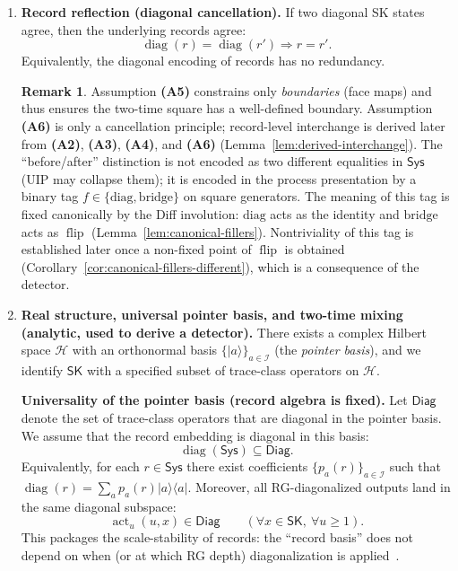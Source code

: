 \documentclass[aps,prl,reprint]{revtex4-2}
\newcommand{\Sys}{\mathsf{Sys}}
\newcommand{\SK}{\mathsf{SK}}
\newcommand{\diag}{\operatorname{diag}}
\newcommand{\flip}{\operatorname{flip}}
\newcommand{\actU}{\operatorname{act}_u}
\theoremstyle{definition}
\newtheorem{remark}{Remark}[section]
\theoremstyle{plain}
\begin{document}
\begin{enumerate}[label=\textbf{(A\arabic*)},leftmargin=*,itemsep=0.6em]
\item \textbf{Record reflection (diagonal cancellation).}
If two diagonal SK states agree, then the underlying records agree:
\[
  \diag(r) = \diag(r') \Rightarrow r = r'.
\]
Equivalently, the diagonal encoding of records has no redundancy.

\begin{remark}
\label{rem:limited-scope-theorem-translation-clean-001}
Assumption \textbf{(A5)} constrains only \emph{boundaries} (face maps) and thus
ensures the two-time square has a well-defined boundary. Assumption \textbf{(A6)}
is only a cancellation principle; record-level interchange is derived later from
\textbf{(A2)}, \textbf{(A3)}, \textbf{(A4)}, and \textbf{(A6)} (Lemma~\ref{lem:derived-interchange}). The
``before/after'' distinction is not encoded as two different equalities in
$\Sys$ (UIP may collapse them); it is encoded in the process presentation by a
binary tag $f\in\{\mathrm{diag},\mathrm{bridge}\}$ on square generators. The
meaning of this tag is fixed canonically by the Diff involution: $\mathrm{diag}$
acts as the identity and $\mathrm{bridge}$ acts as $\flip$ (Lemma~\ref{lem:canonical-fillers}).
Nontriviality of this tag is established later once a non-fixed point of $\flip$
is obtained (Corollary~\ref{cor:canonical-fillers-different}), which is a
consequence of the detector.
\end{remark}

\item \textbf{Real structure, universal pointer basis, and two-time mixing (analytic, used to derive a detector).}
There exists a complex Hilbert space $\mathcal H$ with an orthonormal basis
$\{\lvert a\rangle\}_{a\in\mathcal I}$ (the \emph{pointer basis}), and we identify
$\SK$ with a specified subset of trace-class operators on $\mathcal H$.

\medskip
\noindent
\textbf{Universality of the pointer basis (record algebra is fixed).}
Let $\mathsf{Diag}$ denote the set of trace-class operators that are diagonal in the pointer basis.
We assume that the record embedding is diagonal in this basis:
\[
  \diag(\Sys)\subseteq \mathsf{Diag}.
\]
Equivalently, for each $r\in\Sys$ there exist coefficients $\{p_a(r)\}_{a\in\mathcal I}$
such that $\diag(r)=\sum_a p_a(r)\lvert a\rangle\langle a\rvert$.
Moreover, all RG-diagonalized outputs land in the same diagonal subspace:
\[
  \actU(u,x)\in \mathsf{Diag}\qquad(\forall x\in\SK,\ \forall u\ge 1).
\]
This packages the scale-stability of records: the ``record basis'' does not depend on
when (or at which RG depth) diagonalization is applied~\cite{Zurek1981PointerBasis,JoosZeh1985Emergence,Zurek2003Decoherence}.


\end{enumerate}
\end{document}
